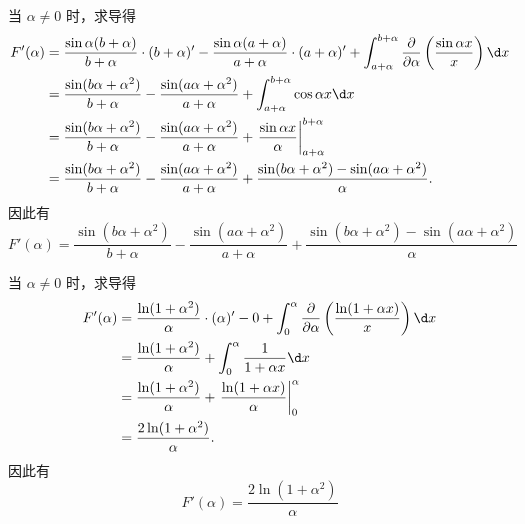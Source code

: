 \begin{solution}
    当 $\alpha \neq 0$ 时，求导得
    \begin{equation}
        \begin{aligned}
            F'(\alpha) & = \frac{\sin \alpha(b+\alpha)}{b+\alpha} \cdot (b+\alpha)' - \frac{\sin \alpha(a+\alpha)}{a+\alpha} \cdot (a+\alpha)' + \int_{a+\alpha}^{b+\alpha} \frac{\partial}{\partial \alpha} \left( \frac{\sin \alpha x}{x} \right) \d x \\
                       & = \frac{\sin(b\alpha + \alpha^2)}{b+\alpha} - \frac{\sin(a\alpha + \alpha^2)}{a+\alpha} + \int_{a+\alpha}^{b+\alpha} \cos \alpha x \d x                                                                                         \\
                       & = \frac{\sin(b\alpha + \alpha^2)}{b+\alpha} - \frac{\sin(a\alpha + \alpha^2)}{a+\alpha} + \left. \frac{\sin \alpha x}{\alpha} \right|_{a+\alpha}^{b+\alpha}                                                                     \\
                       & = \frac{\sin(b\alpha + \alpha^2)}{b+\alpha} - \frac{\sin(a\alpha + \alpha^2)}{a+\alpha} + \frac{\sin(b\alpha + \alpha^2) - \sin(a\alpha + \alpha^2)}{\alpha}.
        \end{aligned}
    \end{equation}
    因此有
    \begin{equation}
        \boxed{F'(\alpha) = \frac{\sin(b\alpha + \alpha^2)}{b+\alpha} - \frac{\sin(a\alpha + \alpha^2)}{a+\alpha} + \frac{\sin(b\alpha + \alpha^2) - \sin(a\alpha + \alpha^2)}{\alpha}}
    \end{equation}


    当 $\alpha \neq 0$ 时，求导得
    \begin{equation}
        \begin{aligned}
            F'(\alpha) & = \frac{\ln(1+\alpha^2)}{\alpha} \cdot (\alpha)' - 0 + \int_{0}^{\alpha} \frac{\partial}{\partial \alpha} \left( \frac{\ln(1+\alpha x)}{x} \right) \d x \\
                       & = \frac{\ln(1+\alpha^2)}{\alpha} + \int_{0}^{\alpha} \frac{1}{1 + \alpha x} \d x                                                                        \\
                       & = \frac{\ln(1+\alpha^2)}{\alpha} + \left. \frac{\ln(1+\alpha x)}{\alpha} \right|_{0}^{\alpha}                                                           \\
                       & = \frac{2\ln(1+\alpha^2)}{\alpha}.
        \end{aligned}
    \end{equation}
    因此有
    \begin{equation}
        \boxed{F'(\alpha) = \frac{2\ln(1+\alpha^2)}{\alpha}}
    \end{equation}


\end{solution}
